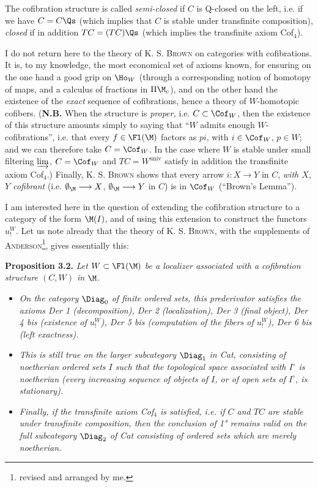 The cofibration structure is called \textit{semi-closed} if $C$ is Q-closed on the left, i.e. if we have $C=C\Qs$ (which implies that $C$ is stable under transfinite composition), \textit{closed} if in addition $TC=(TC)\Qs$ (which implies the transfinite axiom Cof$_4$).

I do not return here to the theory of K. S. \textsc{Brown} on categories with cofibrations. It is, to my knowledge, the most economical set of axioms known, for ensuring on the one hand a good grip on $\Ho_W$ (through a corresponding notion of homotopy of maps, and a calculus of fractions in $\Pi\M_{\mathrm{c}}$), and on the other hand the existence of the \textit{exact} sequence of cofibrations, hence a theory of $W$-homotopic cofibers. (\textbf{N.B.} When the structure is \textit{proper,} i.e. $C\subset\Cof_W$, then the existence of this structure amounts simply to saying that ``$W$ admits enough $W$-cofibrations'', i.e. that every $f\in\Fl(\M)$ factors as $pi$, with $i\in\Cof_W$, $p\in W$; and we can therefore take $C=\Cof_W$. In the case where $W$ is stable under small filtering $\varinjlim$, $C=\Cof_W$ and $TC=W^{\mathrm{univ}}$ satisfy in addition the transfinite axiom Cof$_4$.) Finally, K. S. \textsc{Brown} shows that every arrow $i : X\longrightarrow Y$ in $C$, \textit{with $X$, $Y$ cofibrant} (i.e. $\emptyset_{\M}\longrightarrow X$, $\emptyset_{\M}\longrightarrow Y$ in $C$) is in $\Cof_W$ (``Brown's Lemma'').

I am interested here in the question of extending the cofibration structure to a category of the form $\M(I)$, and of using this extension to construct
the functors $u^{W}_{!}$. Let us note already that the theory of K. S. \textsc{Brown}, with the supplements of \textsc{Anderson}\footnote[20]{revised and arranged by me.}, gives essentially this:


\textbf{Proposition 3.2.} \textit{Let $W\subset\Fl(\M)$ be a localizer associated with a cofibration structure $(C,W)$ in $\M$.}
\begin{itemize}[leftmargin=3em,labelwidth=2.5em,align=right]
\item[1°)] \textit{On the category \textup{$\Diag_0$} of \textup{finite} ordered sets, this prederivator satisfies the axioms Der 1 (decomposition), Der 2 (localization), Der 3 (final object), Der 4 bis (existence of $u^{W}_{!}$), Der 5 bis (computation of the fibers of $u^{W}_{!}$), Der 6 bis (left exactness).}
\item[2°)] \textit{This is still true on the larger subcategory \textup{$\Diag_1$} in \textup{Cat}, consisting of \textup{noetherian} ordered sets $I$ such that the topological space associated with $I^{\circ}$ is noetherian (every increasing sequence of objects of $I$, or of open sets of $I^{\circ}$, is stationary).}
\item[3°)] \textit{Finally, if the transfinite axiom Cof$_4$ is satisfied, i.e. if $C$ and $TC$ are stable under transfinite composition, then the conclusion of \textup{1°} remains valid on the full subcategory \textup{$\Diag_2$} of \textup{Cat} consisting of ordered sets which are merely noetherian.}
\end{itemize}

